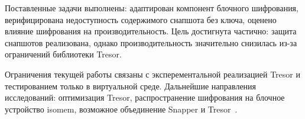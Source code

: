 \documentclass[oneside,final,14pt,a4paper]{extreport}
\theoremstyle{definition}
\theoremstyle{remark}
\theoremstyle{remark}
\begin{document}
Поставленные задачи выполнены: адаптирован компонент блочного шифрования, верифицирована недоступность содержимого снапшота без ключа, оценено влияние шифрования на производительность. Цель достигнута частично: защита снапшотов реализована, однако производительность значительно снизилась из-за ограничений библиотеки Tresor.

Ограничения текущей работы связаны с эксперементальной реализацией Tresor и тестированием только в виртуальной среде. Дальнейшие направления исследований: оптимизация Tresor, распространение шифрования на блочное устройство isomem, возможное объединение Snapper и Tresor~\cite{FOSDEM_Snapper_paper}.

\printbibliography[heading=bibintoc,title={Список использованной литературы}]
% 
\end{document}
